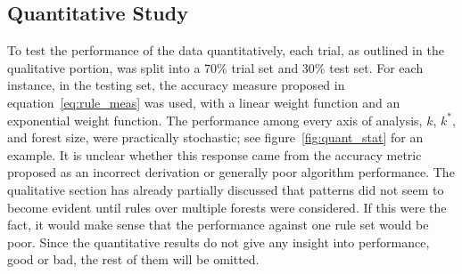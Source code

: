\documentclass[11pt]{article}
\begin{document}
\subsection{Quantitative Study}
To test the performance of the data quantitatively, each trial, as outlined in the qualitative portion, was split into a 70\% trial set and 30\% test set. For each instance, in the testing set, the accuracy measure proposed in equation~\ref{eq:rule_meas} was used, with a linear weight function and an exponential weight function. The performance among every axis of analysis, $k$, $k^*$, and forest size, were practically stochastic; see figure~\ref{fig:quant_stat} for an example. It is unclear whether this response came from the accuracy metric proposed as an incorrect derivation or generally poor algorithm performance. The qualitative section has already partially discussed that patterns did not seem to become evident until rules over multiple forests were considered. If this were the fact, it would make sense that the performance against one rule set would be poor. Since the quantitative results do not give any insight into performance, good or bad, the rest of them will be omitted. 
\end{document}
